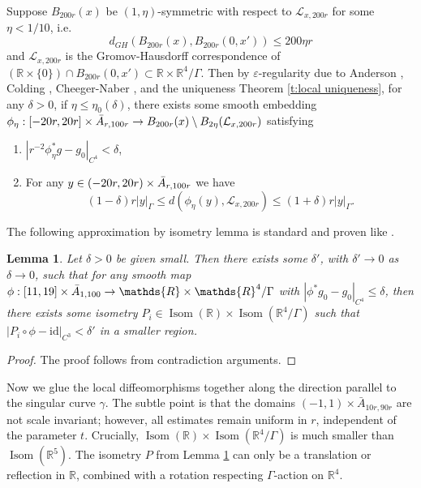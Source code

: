 \documentclass[11pt,reqno]{amsart}
\numberwithin{equation}{section}
\newcommand{\RR}{\mathds{R}}
\newcommand{\cL}{\mathcal{L}}
\newtheorem{lemma}[thm]{Lemma}
\theoremstyle{definition}
\theoremstyle{remark}
\begin{document}
Suppose $B_{200r}(x)$ be $(1,\eta)$-symmetric with respect to $\cL_{x,200r}$ for some $\eta < 1/10$, i.e. $$d_{GH}(B_{200r}(x), B_{200r}(0,x')) \leqslant 200\eta r$$ and $\cL_{x,200r}$ is the Gromov-Hausdorff correspondence of $(\RR \times \{0\}) \cap B_{200r}(0,x') \subset \RR \times \RR^4/\Gamma$. Then by $\varepsilon$-regularity due to Anderson \cite{and}, Colding \cite{col}, Cheeger-Naber \cite{cn}, and the uniqueness Theorem \ref{t:local uniqueness}, for any $\delta>0$, if $\eta\leqslant \eta_0(\delta)$, there exists some smooth embedding $\phi_{\eta} : [-20r, 20r] \times  {\Bar{A}}_{r, 100r} \to B_{200r}(x) \setminus B_{2\eta}(\cL_{x,200r}) 
$ satisfying
\begin{enumerate}
    \item $|r^{-2}\phi_{\eta}^* g - g_0|_{C^4} < \delta$,
    \item For any $y \in (-20r, 20r) \times {\Bar{A}}_{r, 100r}$ we have
    \begin{equation}\label{e:glue;gamma distance}
        (1-\delta) r |y|_{\Gamma} \leqslant  d( \phi_{\eta}(y), \cL_{x,200r}) \leqslant (1+\delta) r |y|_{\Gamma}.
    \end{equation}
\end{enumerate}


The following approximation by isometry lemma is standard and proven like \cite[Lemma 5.8]{DS}.


\begin{lemma}\label{l:isom appro}
    Let $\delta>0$ be given small. Then there exists some $\delta'$, with $\delta' \to 0 $ as $\delta \to 0$,  such that for any smooth map $\phi: [11,19] \times \Bar{A}_{1,100} \to \RR \times \RR^4/\Gamma$ with $|\phi^* g_0 - g_0|_{C^4} \leqslant \delta$, then there exists some isometry $P_i \in \operatorname{Isom}(\RR) \times \operatorname{Isom}(\RR^4/\Gamma)$ such that $|P_i \circ \phi -  \mathrm{id}|_{C^3} < \delta'$ in a smaller region. 
\end{lemma}

\begin{proof}
    The proof follows from contradiction arguments.
\end{proof}










Now we glue the local diffeomorphisms together along the direction parallel to the singular curve $\gamma$.  
The subtle point is that the domains $(-1,1) \times \bar{A}_{10r,90r}$ are not scale invariant; however, all estimates remain uniform in $r$, independent of the parameter $t$. Crucially, $\operatorname{Isom}(\RR) \times \operatorname{Isom}(\RR^4/\Gamma)$ is much smaller than $\operatorname{Isom}(\RR^5)$. The isometry $P$ from Lemma \ref{l:isom appro} can only be a translation or reflection in $\RR$, combined with a rotation respecting $\Gamma$-action on $\RR^4$. 
\end{document}
